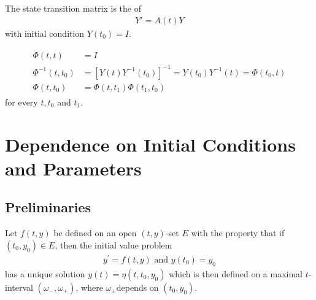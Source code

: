 \documentclass{article}
\begin{document}
\begin{cora}
The state transition matrix is the  of
\begin{align*}
Y'=A(t) Y
\end{align*}
with initial condition $Y(t_{0})=I$.
\end{cora}


\begin{cora}
\begin{align*}
\begin{aligned}
{\Phi}(t, t) &=I \\
{\Phi}^{-1}\left(t, t_{0}\right) &=\left[{Y}(t) {Y}^{-1}\left(t_{0}\right)\right]^{-1}={Y}\left(t_{0}\right) {Y}^{-1}(t)={\Phi}\left(t_{0}, t\right) \\
{\Phi}\left(t, t_{0}\right) &={\Phi}\left(t, t_{1}\right) {\Phi}\left(t_{1}, t_{0}\right)
\end{aligned}
\end{align*}
for every $t, t_{0}$ and $t_{1}$.
\end{cora}

\section{Dependence on Initial Conditions and Parameters}
\subsection{Preliminaries}
Let $f(t, y)$ be defined on an open $(t, y)$-set $E$ with the property that if $\left(t_{0}, y_{0}\right) \in E$, then the initial value problem
\begin{align}
y^{\prime}=f(t, y) \text { and } y\left(t_{0}\right)=y_{0}\label{eq:1.1fdaad}
\end{align}
has a unique solution $y(t)=\eta\left(t, t_{0}, y_{0}\right)$ which is then defined on a maximal $t$-interval $\left(\omega_{-}, \omega_{+}\right)$, where $\omega_{\pm}$depends on $\left(t_{0}, y_{0}\right)$.
\end{document}
